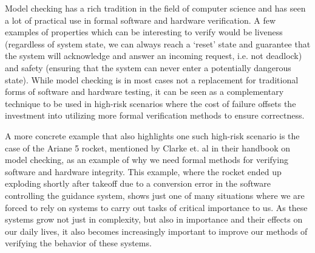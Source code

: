 Model checking has a rich tradition in the field of computer science and has seen a lot of practical use in formal software and hardware verification. A few examples of properties which can be interesting to verify would be liveness (regardless of system state, we can always reach a `reset' state and guarantee that the system will acknowledge and answer an incoming request, i.e. not deadlock) and safety (ensuring that the system can never enter a potentially dangerous state). While model checking is in most cases not a replacement for traditional forms of software and hardware testing, it can be seen as a complementary technique to be used in high-risk scenarios where the cost of failure offsets the investment into utilizing more formal verification methods to ensure correctness.

A more concrete example that also highlights one such high-risk scenario is the case of the Ariane 5 rocket, mentioned by Clarke et. al in their handbook on model checking\cite{Clarke1999}, as an example of why we need formal methods for verifying software and hardware integrity. This example, where the rocket ended up exploding shortly after takeoff due to a conversion error in the software controlling the guidance system, shows just one of many situations where we are forced to rely on systems to carry out tasks of critical importance to us. As these systems grow not just in complexity, but also in importance and their effects on our daily lives, it also becomes increasingly important to improve our methods of verifying the behavior of these systems. 

